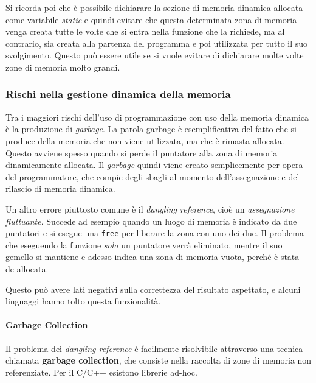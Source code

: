 \documentclass[
  paper=a4,
  oneside  ,captions=tableheading
]{scrbook}
\newcommand{\passthrough}[1]{#1}
\begin{document}
Si ricorda poi che è possibile dichiarare la sezione di memoria dinamica
allocata come variabile \emph{static} e quindi evitare che questa
determinata zona di memoria venga creata tutte le volte che si entra
nella funzione che la richiede, ma al contrario, sia creata alla
partenza del programma e poi utilizzata per tutto il suo svolgimento.
Questo può essere utile se si vuole evitare di dichiarare molte volte
zone di memoria molto grandi.

\hypertarget{rischi-nella-gestione-dinamica-della-memoria}{%
\subsubsection{Rischi nella gestione dinamica della
memoria}\label{rischi-nella-gestione-dinamica-della-memoria}}

Tra i maggiori rischi dell'uso di programmazione con uso della memoria
dinamica è la produzione di \emph{garbage}. La parola garbage è
esemplificativa del fatto che si produce della memoria che non viene
utilizzata, ma che è rimasta allocata. Questo avviene spesso quando si
perde il puntatore alla zona di memoria dinamicamente allocata. Il
\emph{garbage} quindi viene creato semplicemente per opera del
programmatore, che compie degli sbagli al momento dell'assegnazione e
del rilascio di memoria dinamica.

Un altro errore piuttosto comune è il \emph{dangling reference}, cioè un
\emph{assegnazione fluttuante}. Succede ad esempio quando un luogo di
memoria è indicato da due puntatori e si esegue una
\passthrough{\lstinline!free!} per liberare la zona con uno dei due. Il
problema che eseguendo la funzione \emph{solo} un puntatore verrà
eliminato, mentre il suo gemello si mantiene e adesso indica una zona di
memoria vuota, perché è stata de-allocata.

Questo può avere lati negativi sulla correttezza del risultato
aspettato, e alcuni linguaggi hanno tolto questa funzionalità.

\hypertarget{garbage-collection}{%
\paragraph{Garbage Collection}\label{garbage-collection}}

Il problema dei \emph{dangling reference} è facilmente risolvibile
attraverso una tecnica chiamata \textbf{garbage collection}, che
consiste nella raccolta di zone di memoria non referenziate. Per il
C/C++ esistono librerie ad-hoc.
\end{document}
